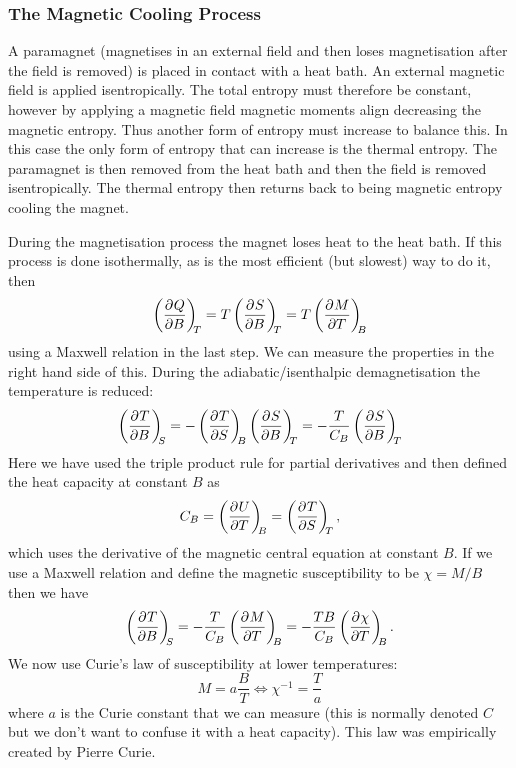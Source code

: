 \documentclass[a4paper]{article}
\begin{document}
    \subsubsection{The Magnetic Cooling Process}
    A paramagnet (magnetises in an external field and then loses magnetisation after the field is removed) is placed in contact with a heat bath.
    An external magnetic field is applied isentropically.
    The total entropy must therefore be constant, however by applying a magnetic field magnetic moments align decreasing the magnetic entropy.
    Thus another form of entropy must increase to balance this.
    In this case the only form of entropy that can increase is the thermal entropy.
    The paramagnet is then removed from the heat bath and then the field is removed isentropically.
    The thermal entropy then returns back to being magnetic entropy cooling the magnet.
    
    During the magnetisation process the magnet loses heat to the heat bath.
    If this process is done isothermally, as is the most efficient (but slowest) way to do it, then
    \[\left(\pdv[]{Q}{B}\right)_{\!\!{T}} = T\left(\pdv[]{S}{B}\right)_{\!\!{T}} = T\left(\pdv[]{M}{T}\right)_{\!\!{B}}\]
    using a Maxwell relation in the last step.
    We can measure the properties in the right hand side of this.
    During the adiabatic/isenthalpic demagnetisation the temperature is reduced:
    \[\pdvconst{T}{B}{S} = -\pdvconst{T}{S}{B}\pdvconst{S}{B}{T} = -\frac{T}{C_B}\pdvconst{S}{B}{T}\]
    Here we have used the triple product rule for partial derivatives and then defined the heat capacity at constant \(B\) as
    \[C_B = \left(\pdv[]{U}{T}\right)_{\!\!{B}} = \left(\pdv[]{T}{S}\right)_{\!\!{T}},\]
    which uses the derivative of the magnetic central equation at constant \(B\).
    If we use a Maxwell relation and define the magnetic susceptibility to be \(\chi = M/B\) then we have
    \begin{equation}\label{eqn:dT/dB const S}
        \left(\pdv[]{T}{B}\right)_{\!\!{S}} = -\frac{T}{C_B}\left(\pdv[]{M}{T}\right)_{\!\!{B}} = -\frac{TB}{C_B}\left(\pdv[]{\chi}{T}\right)_{\!\!{B}}.
    \end{equation}
    We now use Curie's law of susceptibility at lower temperatures:
    \[M = a\frac{B}{T} \iff \chi^{-1} = \frac{T}{a}\]
    where \(a\) is the Curie constant that we can measure (this is normally denoted \(C\) but we don't want to confuse it with a heat capacity).
    This law was empirically created by Pierre Curie.
    
\end{document}
